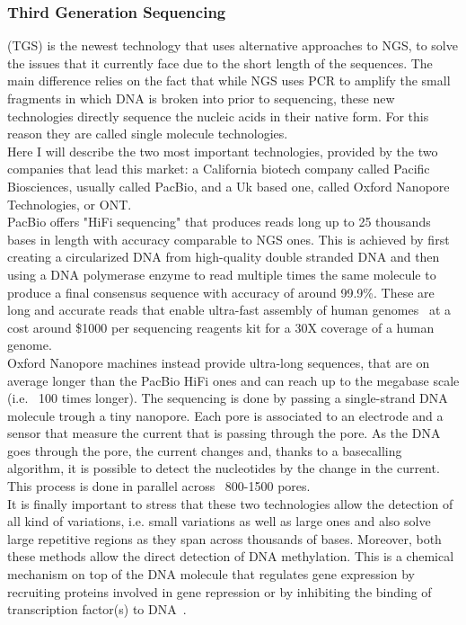 \subsubsection{Third Generation Sequencing} (TGS) is the newest technology that uses alternative approaches to NGS, to solve the issues that it currently face due to the short length of the sequences. The main difference relies on the fact that while NGS uses PCR to amplify the small fragments in which DNA is broken into prior to sequencing, these new technologies directly sequence the nucleic acids in their native form. For this reason they are called single molecule technologies.\\
Here I will describe the two most important technologies, provided by the two companies that lead this market: a California biotech company called Pacific Biosciences, usually called PacBio, and a Uk based one, called Oxford Nanopore Technologies, or ONT.\\
PacBio offers "HiFi sequencing" that produces reads long up to 25 thousands bases in length with accuracy comparable to NGS ones. This is achieved by first creating a circularized DNA from high-quality double stranded DNA and then using a DNA polymerase enzyme to read multiple times the same molecule to produce a final consensus sequence with accuracy of around 99.9\%. These are long and accurate reads that enable ultra-fast assembly of human genomes~\cite{mdbg} at a cost around \$1000 per sequencing reagents kit for a 30X coverage of a human genome. \\
Oxford Nanopore machines instead provide ultra-long sequences, that are on average longer than the PacBio HiFi ones and can reach up to the megabase scale (i.e. ~100 times longer). The sequencing is done by passing a single-strand DNA molecule trough a tiny nanopore. Each pore is associated to an electrode and a sensor that measure the current that is passing through the pore. As the DNA goes through the pore, the current changes and, thanks to a basecalling algorithm, it is possible to detect the nucleotides by the change in the current. This process is done in parallel across ~800-1500 pores.\\
It is finally important to stress that these two technologies allow the detection of all kind of variations, i.e. small variations as well as large ones and also solve large repetitive regions as they span across thousands of bases. Moreover, both these methods allow the direct detection of DNA methylation. This is a chemical mechanism on top of the DNA molecule that regulates gene expression  by recruiting proteins involved in gene repression or by inhibiting the binding of transcription factor(s) to DNA~\cite{methylation}. \\

